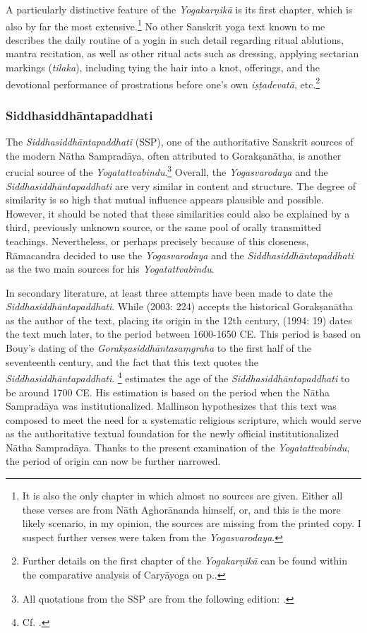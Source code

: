   A particularly distinctive feature of the \emph{Yogakarṇikā} is its first chapter, which is also by far the most extensive.\footnote{It is also the only chapter in which almost no sources are given. Either all these verses are from Nāth Aghorānanda himself, or, and this is the more likely scenario, in my opinion, the sources are missing from the printed copy. I suspect further verses were taken from the \emph{Yogasvarodaya}.} No other Sanskrit yoga text known to me describes the daily routine of a yogin in such detail regarding ritual ablutions, mantra recitation, as well as other ritual acts such as dressing, applying sectarian markings (\textit{tilaka}), including tying the hair into a knot, offerings, and the devotional performance of prostrations before one's own \textit{iṣṭadevatā}, etc.\footnote{Further details on the first chapter of the \emph{Yogakarṇikā} can be found within the comparative analysis of Caryāyoga on p.\pageref{caryasvaro}.}

\subsubsection{Siddhasiddhāntapaddhati}

The \emph{Siddhasiddhāntapaddhati} (SSP), one of the authoritative Sanskrit sources of the modern Nātha Sampradāya, often attributed to Gorakṣanātha, is another crucial source of the \emph{Yogatattvabindu}.\footnote{All quotations from the SSP are from the following edition: \cite{ssplonavla}.} Overall, the \emph{Yogasvarodaya} and the \emph{Siddhasiddhāntapaddhati} are very similar in content and structure. The degree of similarity is so high that mutual influence appears plausible and possible. However, it should be noted that these similarities could also be explained by a third, previously unknown source, or the same pool of orally transmitted teachings. Nevertheless, or perhaps precisely because of this closeness, Rāmacandra decided to use the \emph{Yogasvarodaya} and the \emph{Siddhasiddhāntapaddhati} as the two main sources for his \emph{Yogatattvabindu}.

In secondary literature, at least three attempts have been made to date the \emph{Siddhasiddhāntapaddhati}. While \citeauthor{white2003} (2003: 224) accepts the historical Gorakṣanātha as the author of the text, placing its origin in the 12th century, \citeauthor{bouy1994} (1994: 19) dates the text much later, to the period between 1600-1650 CE. This period is based on Bouy's dating of the \emph{Gorakṣasiddhāntasaṃgraha}\nocite{goraksasiddhantasamgraha1973} to the first half of the seventeenth century, and the fact that this text quotes the \emph{Siddhasiddhāntapaddhati}. \citeauthor{mallinsononline2013}\footnote{Cf. .} estimates the age of the \textit{Siddhasiddhāntapaddhati} to be around 1700 CE. His estimation is based on the period when the Nātha Sampradāya was institutionalized. Mallinson hypothesizes that this text was composed to meet the need for a systematic religious scripture, which would serve as the authoritative textual foundation for the newly official institutionalized Nātha Sampradāya. Thanks to the present examination of the \textit{Yogatattvabindu}, the period of origin can now be further narrowed.

